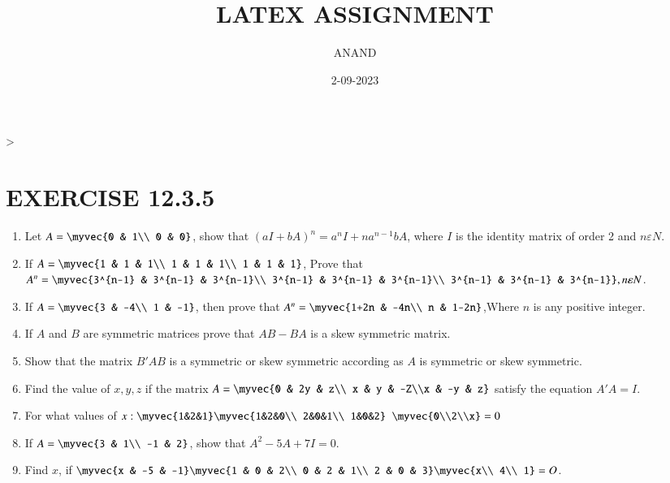 \documentclass{article}
\theoremstyle{remark}
\begin{document}
\title{LATEX ASSIGNMENT}
\author{ANAND}
\date{2-09-2023}
\maketitle                                                                       >
\section*{EXERCISE 12.3.5}
\begin{enumerate}
\item Let $A=\myvec{0 & 1\\ 0 & 0}$, show that $(aI+bA)^n= a^nI+na^{n-1} bA$, where $I$ is the identity matrix of order 2 and $n \varepsilon N$.
\item If $A=\myvec{1 & 1 & 1\\ 1 & 1 & 1\\ 1 & 1 & 1}$, Prove that $A^n=\myvec{3^{n-1} & 3^{n-1} & 3^{n-1}\\ 3^{n-1} & 3^{n-1} & 3^{n-1}\\ 3^{n-1} & 3^{n-1} & 3^{n-1}}, n \varepsilon N$.
\item If $A=\myvec{3 & -4\\ 1 & -1}$, then prove that $A^n=\myvec{1+2n & -4n\\ n & 1-2n}$,Where $n$ is any positive integer.
\item If $A$ and $B$ are symmetric matrices prove that $AB-BA$ is a skew symmetric matrix.
\item Show that the matrix  $B'AB$ is a symmetric or skew symmetric according as $A$ is symmetric or skew symmetric.
\item Find the value of $x,y,z$ if the matrix $A=\myvec{0 & 2y & z\\ x & y & -Z\\x & -y & z}$ satisfy the equation $A'A= I$.
\item For what values  of $x : \myvec{1&2&1} \myvec{1&2&0\\ 2&0&1\\ 1&0&2}$ $\myvec{0\\2\\x}=0$
\item If $A=\myvec{3 & 1\\ -1 & 2}$, show that $A^2-5A+7I=0$.
\item Find $x$, if $\myvec{x & -5 & -1} \myvec{1 & 0 & 2\\ 0 & 2 & 1\\ 2 & 0 & 3} \myvec{x\\ 4\\ 1}=O$. 

\end{enumerate}
\end{document}
